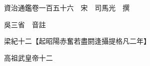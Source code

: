 










 


 
 


 

  
  
  
  
  





  
  
  
  
  
 
  

  

  
  
  



  

 
 

  
   




  

  
  


  　　資治通鑑卷一百五十六　宋　司馬光　撰

　　吳三省　音註

　　梁紀十二【起昭陽赤奮若盡閼逢攝提格凡二年】

　　高祖武皇帝十二

